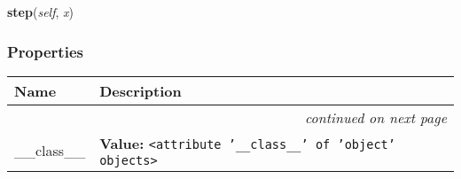     \vspace{0.5ex}

    \begin{boxedminipage}{\textwidth}

    \raggedright \textbf{step}(\textit{self}, \textit{x})

    \end{boxedminipage}



  \subsubsection{Properties}

\begin{longtable}{|p{}|p{}|l}
\cline{1-2}
\cline{1-2} \centering \textbf{Name} & \centering \textbf{Description}& \\
\cline{1-2}
\endhead\cline{1-2}\multicolumn{3}{r}{\small\textit{continued on next page}}\\\endfoot\cline{1-2}
\endlastfoot\raggedright \_\-\_\-c\-l\-a\-s\-s\-\_\-\_\- & \raggedright \textbf{Value:} 
{\tt {\textless}attribute '\_\_class\_\_' of 'object' objects{\textgreater}}&\\
\cline{1-2}
\end{longtable}

